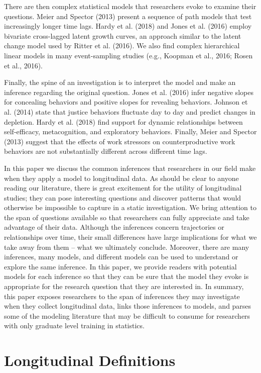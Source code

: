 \documentclass[english,,man]{apa6}
\theoremstyle{definition}
\theoremstyle{definition}
\theoremstyle{definition}
\theoremstyle{remark}
\begin{document}
There are then complex statistical models that researchers evoke to
examine their questions. Meier and Spector (2013) present a sequence of
path models that test increasingly longer time lags. Hardy et al. (2018)
and Jones et al. (2016) employ bivariate cross-lagged latent growth
curves, an approach similar to the latent change model used by Ritter et
al. (2016). We also find complex hierarchical linear models in many
event-sampling studies (e.g., Koopman et al., 2016; Rosen et al., 2016).

Finally, the spine of an investigation is to interpret the model and
make an inference regarding the original question. Jones et al. (2016)
infer negative slopes for concealing behaviors and positive slopes for
revealing behaviors. Johnson et al. (2014) state that justice behaviors
fluctuate day to day and predict changes in depletion. Hardy et al.
(2018) find support for dynamic relationships between self-efficacy,
metacognition, and exploratory behaviors. Finally, Meier and Spector
(2013) suggest that the effects of work stressors on counterproductive
work behaviors are not substantially different across different time
lags.

In this paper we discuss the common inferences that researchers in our
field make when they apply a model to longitudinal data. As should be
clear to anyone reading our literature, there is great excitement for
the utility of longitudinal studies; they can pose interesting questions
and discover patterns that would otherwise be impossible to capture in a
static investigation. We bring attention to the span of questions
available so that researchers can fully appreciate and take advantage of
their data. Although the inferences concern trajectories or
relationships over time, their small differences have large implications
for what we take away from them -- what we ultimately conclude.
Moreover, there are many inferences, many models, and different models
can be used to understand or explore the same inference. In this paper,
we provide readers with potential models for each inference so that they
can be sure that the model they evoke is appropriate for the research
question that they are interested in. In summary, this paper exposes
researchers to the span of inferences they may investigate when they
collect longitudinal data, links those inferences to models, and parses
some of the modeling literature that may be difficult to consume for
researchers with only graduate level training in statistics.

\hypertarget{longitudinal-definitions}{%
\section{Longitudinal Definitions}\label{longitudinal-definitions}}
\end{document}
